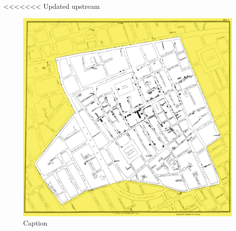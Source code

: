 \documentclass[12pt]{article}
\begin{document}
<<<<<<< Updated upstream
\begin{figure}
\centering
\includegraphics{snowmap_1854}
\caption{Caption}
\label{fig:snow}
\end{figure}
\end{document}
